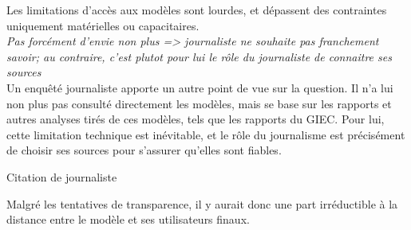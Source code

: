 Les limitations d'accès aux modèles sont lourdes, et dépassent des contraintes uniquement matérielles ou capacitaires. \\

\textit{Pas forcément d'envie non plus
=> journaliste ne souhaite pas franchement savoir; au contraire, c'est plutot pour lui le rôle du journaliste de connaitre ses sources} \\

Un enquêté journaliste apporte un autre point de vue sur la question. Il n'a lui non plus pas consulté directement les modèles, mais se base sur les rapports et autres analyses tirés de ces modèles, tels que les rapports du GIEC. Pour lui, cette limitation technique est inévitable, et le rôle du journalisme est précisément de choisir ses sources pour s'assurer qu'elles sont fiables. 

\begin{displayquote}
    Citation de journaliste
\end{displayquote}

Malgré les tentatives de transparence, il y aurait donc une part irréductible à la distance entre le modèle et ses utilisateurs finaux. 

